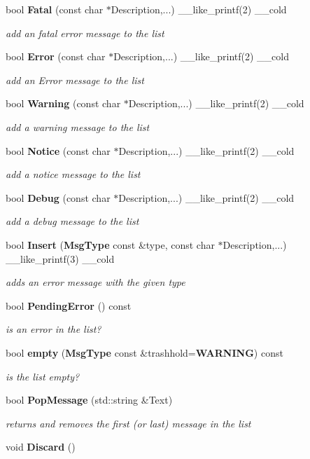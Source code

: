 \begin{DoxyCompactItemize}
bool {\bf \-Fatal} (const char $\ast$\-Description,...) \-\_\-\-\_\-like\-\_\-printf(2) \-\_\-\-\_\-cold
\begin{DoxyCompactList}\small\item\em add an fatal error message to the list \end{DoxyCompactList}\item 
bool {\bf \-Error} (const char $\ast$\-Description,...) \-\_\-\-\_\-like\-\_\-printf(2) \-\_\-\-\_\-cold
\begin{DoxyCompactList}\small\item\em add an \-Error message to the list \end{DoxyCompactList}\item 
bool {\bf \-Warning} (const char $\ast$\-Description,...) \-\_\-\-\_\-like\-\_\-printf(2) \-\_\-\-\_\-cold
\begin{DoxyCompactList}\small\item\em add a warning message to the list \end{DoxyCompactList}\item 
bool {\bf \-Notice} (const char $\ast$\-Description,...) \-\_\-\-\_\-like\-\_\-printf(2) \-\_\-\-\_\-cold
\begin{DoxyCompactList}\small\item\em add a notice message to the list \end{DoxyCompactList}\item 
bool {\bf \-Debug} (const char $\ast$\-Description,...) \-\_\-\-\_\-like\-\_\-printf(2) \-\_\-\-\_\-cold
\begin{DoxyCompactList}\small\item\em add a debug message to the list \end{DoxyCompactList}\item 
bool {\bf \-Insert} ({\bf \-Msg\-Type} const \&type, const char $\ast$\-Description,...) \-\_\-\-\_\-like\-\_\-printf(3) \-\_\-\-\_\-cold
\begin{DoxyCompactList}\small\item\em adds an error message with the given type \end{DoxyCompactList}\item 
bool {\bf \-Pending\-Error} () const 
\begin{DoxyCompactList}\small\item\em is an error in the list? \end{DoxyCompactList}\item 
bool {\bf empty} ({\bf \-Msg\-Type} const \&trashhold={\bf \-W\-A\-R\-N\-I\-N\-G}) const 
\begin{DoxyCompactList}\small\item\em is the list empty? \end{DoxyCompactList}\item 
bool {\bf \-Pop\-Message} (std\-::string \&\-Text)
\begin{DoxyCompactList}\small\item\em returns and removes the first (or last) message in the list \end{DoxyCompactList}\item 
void {\bf \-Discard} ()\label{classGlobalError_a41190a6896a09de84c7b7aa32a9573ba}


\end{DoxyCompactItemize}
